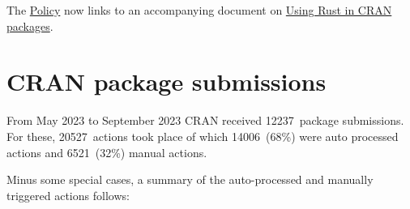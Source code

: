The \href{https://CRAN.R-project.org/web/packages/policies.html}{Policy} now links to an
accompanying document on \href{https://CRAN.R-project.org/web/packages/using_rust.html}{Using Rust in CRAN packages}.

\section{CRAN package submissions}\label{cran-package-submissions}

From May 2023 to September 2023
CRAN received 12237~package submissions.
For these, 20527~actions took place of which
14006~(68\%) were auto processed actions and
6521~(32\%) manual actions.

Minus some special cases, a summary of the auto-processed and manually
triggered actions follows:

